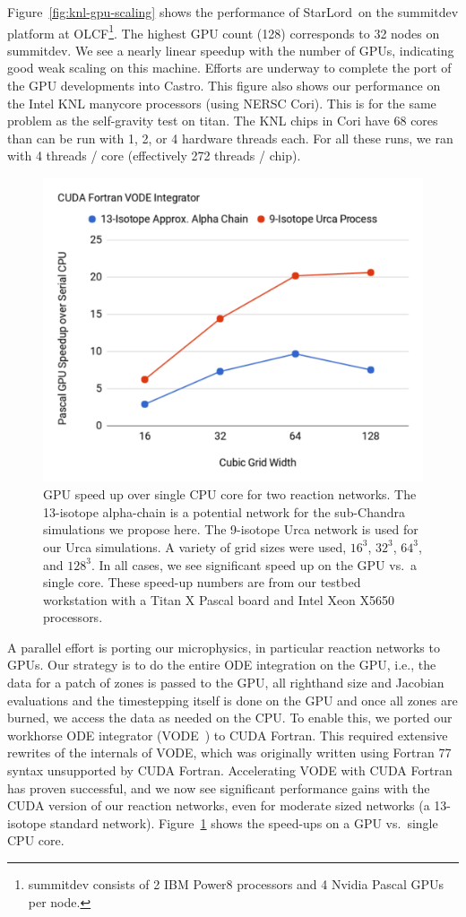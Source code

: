 \documentclass[a4paper]{jpconf}
\newcommand{\castro}{{\sffamily Castro}}
\newcommand{\starlord}{{\sffamily StarLord}}
\newcommand{\MarginPar}[1]{\marginpar{\vskip-\baselineskip\raggedright\tiny\sffamily\hrule\smallskip{\color{red}#1}\par\smallskip\hrule}}
\begin{document}
Figure~\ref{fig:knl-gpu-scaling} shows the performance of
\starlord\ on the summitdev platform at OLCF\footnote{summitdev
  consists of 2 IBM Power8 processors and 4 Nvidia Pascal GPUs per
  node.}.  The highest GPU count (128) corresponds to 32 nodes on
summitdev.  We see a nearly linear speedup with the number of GPUs,
indicating good weak scaling on this machine.  Efforts are underway to
complete the port of the GPU developments into \castro.  This figure
also shows our performance on the Intel KNL manycore processors (using
NERSC Cori).  This is for the same problem as the self-gravity test on
titan. \MarginPar{need more info: base grid?}  The KNL chips in Cori
have 68 cores than can be run with 1, 2, or 4 hardware threads each.
For all these runs, we ran with 4 threads / core (effectively 272
threads / chip).

\begin{figure}[t]
\centering
\includegraphics[width=0.48\linewidth]{CUDA-Fortran-VODE-Integrator}
\begin{minipage}[b]{0.48\linewidth}
\caption{\label{fig:cudaode} GPU speed up over single CPU core for two
  reaction networks.  The 13-isotope alpha-chain is a
  potential network for the sub-Chandra simulations we propose here.
  The 9-isotope Urca network is used for our Urca simulations.  A
  variety of grid sizes were used, $16^3$, $32^3$, $64^3$, and
  $128^3$.  In all cases, we see significant speed up on the GPU
  vs.\ a single core.  These speed-up numbers are from our testbed
  workstation with a Titan X Pascal board and Intel Xeon X5650 processors.}
\end{minipage}
\end{figure}

A parallel effort is porting our microphysics, in particular reaction
networks to GPUs.  Our strategy is to do the entire ODE integration on
the GPU, i.e., the data for a patch of zones is passed to the GPU, all
righthand size and Jacobian evaluations and the timestepping itself is
done on the GPU and once all zones are burned, we access the data as
needed on the CPU.  To enable this, we ported our workhorse ODE
integrator (VODE~\cite{vode}) to CUDA Fortran. This required extensive
rewrites of the internals of VODE, which was originally written using
Fortran 77 syntax unsupported by CUDA Fortran. Accelerating VODE with
CUDA Fortran has proven successful, and we now see significant
performance gains with the CUDA version of our reaction networks, even
for moderate sized networks (a 13-isotope standard network).
Figure~\ref{fig:cudaode} shows the speed-ups on a GPU vs.\ single CPU
core.
\end{document}
